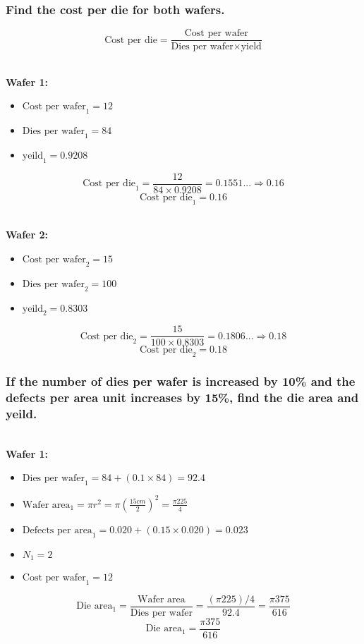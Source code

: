 \documentclass[fleqn]{article}
\begin{document}
\subsubsection{Find the cost per die for both wafers.}
\[ \text{Cost per die} = \frac{\text{Cost per wafer}}{\text{Dies per wafer} \times \text{yield}} \]

\textbf{\\Wafer 1:}
\begin{itemize}[leftmargin=*]
    \item $\text{Cost per wafer}_1 = 12$
    \item $\text{Dies per wafer}_1 = 84$
    \item $\text{yeild}_1 = 0.9208$
\end{itemize}
\[ \text{Cost per die}_1 = \frac{12}{84 \times 0.9208} = 0.1551... \Rightarrow 0.16 \]
\[ \boxed{\text{Cost per die}_1 = 0.16} \]


\textbf{\\Wafer 2:}
\begin{itemize}[leftmargin=*]
    \item $\text{Cost per wafer}_2 = 15$
    \item $\text{Dies per wafer}_2 = 100$
    \item $\text{yeild}_2 = 0.8303$
\end{itemize}
\[ \text{Cost per die}_2 = \frac{15}{100 \times 0.8303} = 0.1806... \Rightarrow 0.18 \]
\[ \boxed{\text{Cost per die}_2 = 0.18} \]

\subsubsection{If the number of dies per wafer is increased by 10\% and the defects per area unit increases by 15\%, find the die area and yeild.}
\textbf{\\Wafer 1:}
\begin{itemize}[leftmargin=*]
    \item $\text{Dies per wafer}_1 = 84 + (0.1 \times 84) = 92.4$
    \item $\text{Wafer area}_1 = \pi r ^2 = \pi (\frac{15cm}{2})^2 = \frac{\pi 225}{4}$
    \item $\text{Defects per area}_1 = 0.020 + (0.15 \times 0.020) = 0.023$
    \item $N_1 = 2$
    \item $\text{Cost per wafer}_1 = 12$
\end{itemize}

\[ \text{Die area}_1 = \frac{\text{Wafer area}}{\text{Dies per wafer}} = \frac{(\pi225)/4}{92.4} = \frac{\pi375}{616} \]
\[ \boxed{\text{Die area}_1 = \frac{\pi375}{616}} \]
\end{document}
